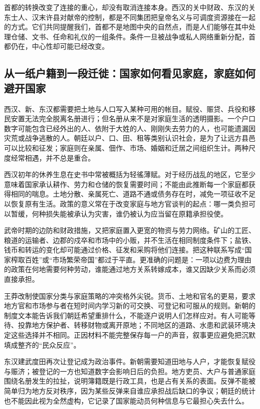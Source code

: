 首都的转换改变了连接的重心，却没有取消连接本身。西汉的关中财政、东汉的关东士人、汉末许县对献帝的控制，都是不同集团把皇帝名义与可调度资源接在一起的方式。它们共同提醒我们，首都不是地图中央的自然点，而是人们能够在其中处理仓储、文书、任命和礼仪的一组条件。条件一旦被战争或私人网络重新分配，首都仍在，中心性却可能已经改变。

\subsection{从一纸户籍到一段迁徙：国家如何看见家庭，家庭如何避开国家}

西汉、新、东汉都需要把土地与人口写入某种可用的帐目。赋役、赈贷、兵役和移民安置无法完全脱离名册进行；但名册从来不是对家庭生活的透明摄影。一个户口数字可能包含已经外出的人、依附于大姓的人、刚刚失去劳力的人，也可能遗漏因灾荒或战争逃散的人。朝廷以户、口、田、租等类别认识社会，是为了让远方县邑可以比较和征发；家庭则在亲属、佃作、市场、婚姻和迁居之间组织生计。两种尺度经常相遇，并不总是重合。

西汉初年的休养生息在史书中常被概括为轻徭薄赋。对于经历战乱的地区，它至少意味着国家承认耕作、劳力和仓储的恢复需要时间；不能由此推断每一个家庭都获得相同的喘息。土地分散、亲属死亡、道路不通或债务存在时，减免一项征收不足以恢复原有生活。政策的意义常在于改变家庭与地方官谈判的起点：哪一类负担可以暂缓，何种损失能被承认为灾害，谁仍被认为应当留在原籍承担役使。

武帝时期的边防和财政措施，又把家庭置入更宽的物资与劳力网络。矿山的工匠、粮道的运输者、边郡的戍卒和市场中的小贩，并不生活在相同制度条件下；盐铁、钱币和转运的变化却可能通过价格、征发和采购将他们连接。把这种联系写成“国家榨取百姓”或“市场繁荣帝国”都过于平直。更准确的问题是：一项以边费为理由的政策在何地需要何种劳动，谁能通过地方关系转嫁成本，谁又因缺少关系而必须直接承担。

王莽改制使国家分类与家庭策略的冲突格外尖锐。货币、土地和官名的更易，要求地方官和市场参与者在短时间内学习新的可交换、可登记和可服从的规则。新朝的制度文本能告诉我们朝廷希望重排什么，不能逐户说明人们怎样应对。有人可能等待、投靠地方保护者、转移财物或离开原地；不同地区的道路、水患和武装环境决定这些选择并不相同。正因材料不能完整保存每一户的声音，叙事更应避免把沉默填成整齐的“民众反应”。

东汉建武度田再次让登记成为政治事件。新朝需要知道田地与人户，才能恢复赋役与赈济；被登记的一方也知道数字会影响日后的负担。地方吏员、大户与普通家庭围绕名册发生的拉扯，说明簿籍既是行政工具，也是占有关系的表面。反弹不能被简单归为地方反对秩序，因为某些反弹来自谁应承担战后缺口的争议；朝廷的统计也不能因此视为全然虚构，它记录了国家能动员何种信息与它最担心失去什么。

